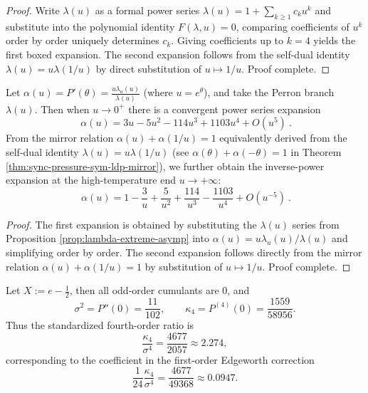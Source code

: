 \begin{proof}
Write \(\lambda(u)\) as a formal power series
\(
\lambda(u)=1+\sum_{k\ge 1}c_k u^k
\)
and substitute into the polynomial identity \(F(\lambda,u)=0\), comparing coefficients of \(u^k\) order by order uniquely determines \(c_k\).
Giving coefficients up to \(k=4\) yields the first boxed expansion.
The second expansion follows from the self-dual identity \(\lambda(u)=u\lambda(1/u)\) by direct substitution of \(u\mapsto 1/u\). Proof complete.
\end{proof}

\begin{corollary}[Local expansion of endpoint density \texorpdfstring{$\alpha(u)=P'(\log u)$}{alpha(u)=P'(log u)}]\label{cor:alpha-endpoint-series}
Let \(\alpha(u)=P'(\theta)=\frac{u\lambda_u(u)}{\lambda(u)}\) (where \(u=e^\theta\)), and take the Perron branch \(\lambda(u)\).
Then when \(u\to 0^+\) there is a convergent power series expansion
\[
\boxed{\ \alpha(u)=3u-5u^2-114u^3+1103u^4+O(u^5)\ }.
\]
From the mirror relation
\(
\alpha(u)+\alpha(1/u)=1
\)
equivalently derived from the self-dual identity \(\lambda(u)=u\lambda(1/u)\) (see \(\alpha(\theta)+\alpha(-\theta)=1\) in Theorem \ref{thm:sync-pressure-sym-ldp-mirror}), we further obtain the inverse-power expansion at the high-temperature end \(u\to+\infty\):
\[
\boxed{\ \alpha(u)=1-\frac{3}{u}+\frac{5}{u^2}+\frac{114}{u^3}-\frac{1103}{u^4}+O(u^{-5})\ }.
\]
\end{corollary}
\begin{proof}
The first expansion is obtained by substituting the \(\lambda(u)\) series from Proposition \ref{prop:lambda-extreme-asymp} into
\(
\alpha(u)=u\lambda_u(u)/\lambda(u)
\)
and simplifying order by order.
The second expansion follows directly from the mirror relation \(\alpha(u)+\alpha(1/u)=1\) by substitution of \(u\mapsto 1/u\). Proof complete.
\end{proof}

\begin{corollary}\label{cor:edgeworth-fourth}
Let $X:=e-\frac12$, then all odd-order cumulants are $0$, and
\[
\sigma^2=P''(0)=\frac{11}{102},\qquad
\kappa_4=P^{(4)}(0)=\frac{1559}{58956}.
\]
Thus the standardized fourth-order ratio is
\[
\frac{\kappa_4}{\sigma^4}=\frac{4677}{2057}\approx 2.274,
\]
corresponding to the coefficient in the first-order Edgeworth correction
\[
\frac{1}{24}\frac{\kappa_4}{\sigma^4}=\frac{4677}{49368}\approx 0.0947.
\]
\end{corollary}

